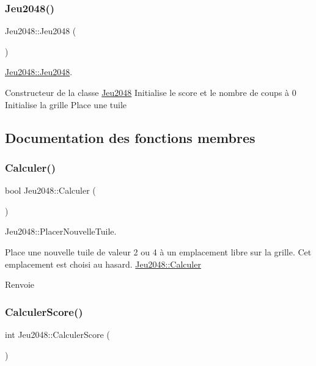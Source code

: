 \subsubsection{\texorpdfstring{Jeu2048()}{Jeu2048()}}
{\footnotesize\ttfamily Jeu2048\+::\+Jeu2048 (\begin{DoxyParamCaption}{ }\end{DoxyParamCaption})}



\hyperlink{class_jeu2048_a851bd5ce17939b16a6a3182b09866b73}{Jeu2048\+::\+Jeu2048}. 

Constructeur de la classe \hyperlink{class_jeu2048}{Jeu2048} Initialise le score et le nombre de coups à 0 Initialise la grille Place une tuile 

\subsection{Documentation des fonctions membres}
\mbox{\label{class_jeu2048_a114d75b40a2eaea021016f8fa609807d}} 
\subsubsection{\texorpdfstring{Calculer()}{Calculer()}}
{\footnotesize\ttfamily bool Jeu2048\+::\+Calculer (\begin{DoxyParamCaption}{ }\end{DoxyParamCaption})\hspace{0.3cm}{\ttfamily [private]}}



Jeu2048\+::\+Placer\+Nouvelle\+Tuile. 

Place une nouvelle tuile de valeur 2 ou 4 à un emplacement libre sur la grille. Cet emplacement est choisi au hasard. \hyperlink{class_jeu2048_a114d75b40a2eaea021016f8fa609807d}{Jeu2048\+::\+Calculer} \begin{DoxyReturn}{Renvoie}

\end{DoxyReturn}
\mbox{\label{class_jeu2048_ae14335ca8d24df723511355cce5dab81}} 
\subsubsection{\texorpdfstring{Calculer\+Score()}{CalculerScore()}}
{\footnotesize\ttfamily int Jeu2048\+::\+Calculer\+Score (\begin{DoxyParamCaption}{ }\end{DoxyParamCaption})\hspace{0.3cm}{\ttfamily [private]}}



